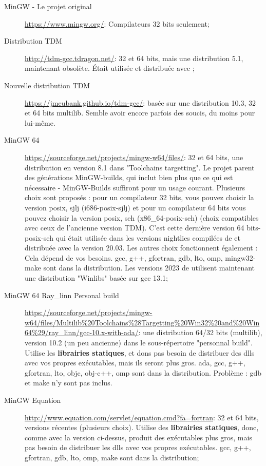 \begin{description}
\item[MinGW - Le projet original] \url{https://www.mingw.org/}: Compilateurs 32 bits seulement;
\item[Distribution TDM]\url{http://tdm-gcc.tdragon.net/}: 32 et 64 bits, mais une distribution 5.1, maintenant obsolète. Était utilisée et distribuée avec ;
\item[Nouvelle distribution TDM]\url{https://jmeubank.github.io/tdm-gcc/}: basée sur une distribution 10.3, 32 et 64 bits multilib. Semble avoir encore parfois des soucis, du moins pour \codeblocks lui-même.
\item[MinGW 64] \url{https://sourceforge.net/projects/mingw-w64/files/}: 32 et 64 bits, une distribution en version 8.1 dans "Toolchains targetting". Le projet parent des générations MinGW-builds, qui inclut bien plus que ce qui est nécessaire - MinGW-Builds suffiront pour un usage courant. Plusieurs choix sont proposés : pour un compilateur 32 bits, vous pouvez choisir la version posix, sjlj (i686-posix-sjlj) et pour un compilateur 64 bits vous pouvez choisir la version posix, seh (x86\_64-posix-seh) (choix compatibles avec ceux de l'ancienne version TDM). C'est cette dernière version 64 bits-posix-seh qui était utilisée dans les versions nightlies compilées de \codeblocks et distribuée avec la version 20.03. Les autres choix fonctionnent également : Cela dépend de vos besoins. gcc, g++, gfortran, gdb, lto, omp, mingw32-make sont dans la distribution. Les versions 2023 de \codeblocks utilisent maintenant une distribution "Winlibs" basée sur gcc 13.1;
\item[MinGW 64 Ray\_linn Personal build] \url{https://sourceforge.net/projects/mingw-w64/files/Multilib%20Toolchains%28Targetting%20Win32%20and%20Win64%29/ray_linn/gcc-10.x-with-ada/}: une distribution 64/32 bits (multilib), version 10.2 (un peu ancienne) dans le sous-répertoire "personnal build". Utilise les \textbf{librairies statiques}, et dons pas besoin de distribuer des dlls avec vos propres exécutables, mais ils seront plus gros. ada, gcc, g++, gfortran, lto, objc, obj-c++, omp sont dans la distribution. Problème : gdb et make n'y sont pas inclus.
\item[MinGW Equation] \url{http://www.equation.com/servlet/equation.cmd?fa=fortran}: 32 et 64 bits, versions récentes (plusieurs choix). Utilise des \textbf{librairies statiques}, donc, comme avec la version ci-dessus, produit des exécutables plus gros, mais pas besoin de distribuer les dlls avec vos propres exécutables.  gcc, g++, gfortran, gdb, lto, omp, make sont dans la distribution;

\end{description}
